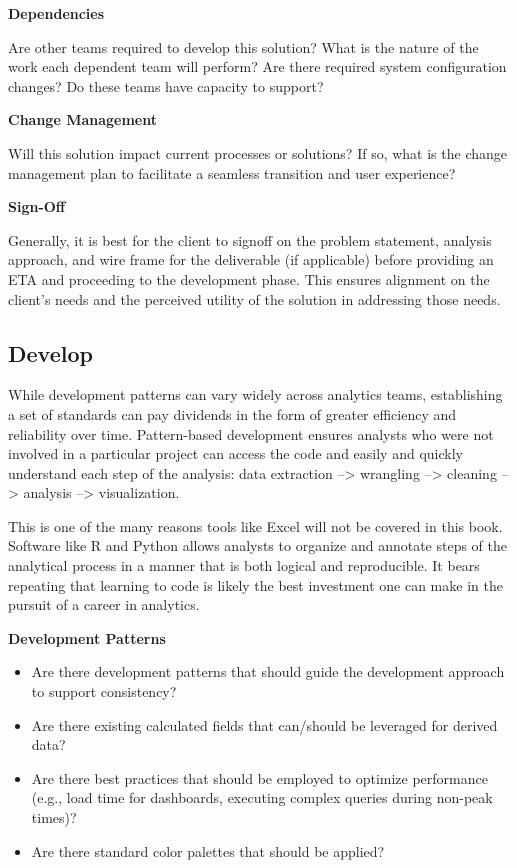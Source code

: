 \documentclass[
]{book}
\providecommand{\tightlist}{%
  \setlength{\itemsep}{0pt}\setlength{\parskip}{0pt}}
\begin{document}
\textbf{Dependencies}

Are other teams required to develop this solution? What is the nature of the work each dependent team will perform? Are there required system configuration changes? Do these teams have capacity to support?

\textbf{Change Management}

Will this solution impact current processes or solutions? If so, what is the change management plan to facilitate a seamless transition and user experience?

\textbf{Sign-Off}

Generally, it is best for the client to signoff on the problem statement, analysis approach, and wire frame for the deliverable (if applicable) before providing an ETA and proceeding to the development phase. This ensures alignment on the client's needs and the perceived utility of the solution in addressing those needs.

\hypertarget{develop}{%
\subsection{Develop}\label{develop}}

While development patterns can vary widely across analytics teams, establishing a set of standards can pay dividends in the form of greater efficiency and reliability over time. Pattern-based development ensures analysts who were not involved in a particular project can access the code and easily and quickly understand each step of the analysis: data extraction --\textgreater{} wrangling --\textgreater{} cleaning --\textgreater{} analysis --\textgreater{} visualization.

This is one of the many reasons tools like Excel will not be covered in this book. Software like R and Python allows analysts to organize and annotate steps of the analytical process in a manner that is both logical and reproducible. It bears repeating that learning to code is likely the best investment one can make in the pursuit of a career in analytics.

\textbf{Development Patterns}

\begin{itemize}
\tightlist
\item
  Are there development patterns that should guide the development approach to support consistency?
\item
  Are there existing calculated fields that can/should be leveraged for derived data?
\item
  Are there best practices that should be employed to optimize performance (e.g., load time for dashboards, executing complex queries during non-peak times)?
\item
  Are there standard color palettes that should be applied?
\end{itemize}
\end{document}
